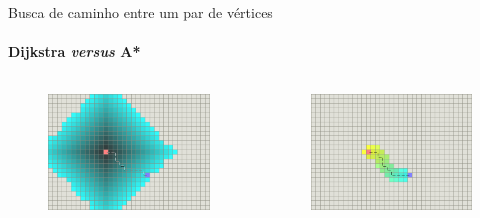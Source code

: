 \begin{frame}{Busca de caminho entre um par de vértices}
\framesubtitle{Dijkstra \textit{versus} A*}

\begin{columns}
	\begin{column}{0.5\textwidth}
		\begin{figure}
			\centering
			\includegraphics[width=\linewidth]{img/dijkstra}
		\end{figure}
	\end{column}
	\begin{column}{0.5\textwidth}
		\begin{figure}
			\centering
			\includegraphics[width=\linewidth]{img/a-star}
		\end{figure}
	\end{column}
\end{columns}
\end{frame}



